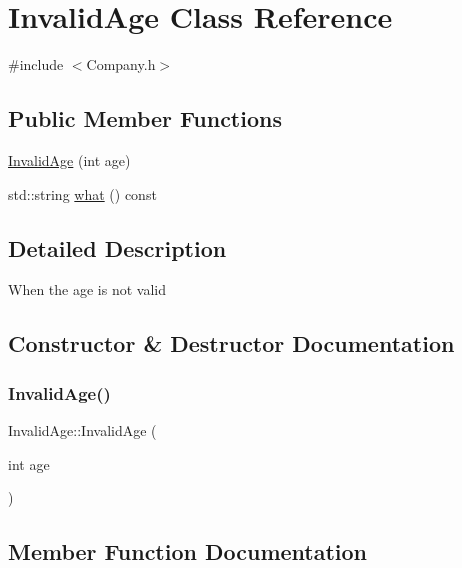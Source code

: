 \hypertarget{class_invalid_age}{}\section{Invalid\+Age Class Reference}
\label{class_invalid_age}


{\ttfamily \#include $<$Company.\+h$>$}

\subsection*{Public Member Functions}
\begin{DoxyCompactItemize}
\item 
\mbox{\hyperlink{class_invalid_age_ae1ed3ee78dd4c589a64d939b90aa09f3}{Invalid\+Age}} (int age)
\item 
std\+::string \mbox{\hyperlink{class_invalid_age_a6961abe914f41e975a7b0ebd526e3ea4}{what}} () const
\end{DoxyCompactItemize}


\subsection{Detailed Description}
When the age is not valid 

\subsection{Constructor \& Destructor Documentation}
\mbox{\label{class_invalid_age_ae1ed3ee78dd4c589a64d939b90aa09f3}} 
\subsubsection{\texorpdfstring{Invalid\+Age()}{InvalidAge()}}
{\footnotesize\ttfamily Invalid\+Age\+::\+Invalid\+Age (\begin{DoxyParamCaption}\item[{int}]{age }\end{DoxyParamCaption})\hspace{0.3cm}{\ttfamily [inline]}}



\subsection{Member Function Documentation}
\mbox{\label{class_invalid_age_a6961abe914f41e975a7b0ebd526e3ea4}} 

